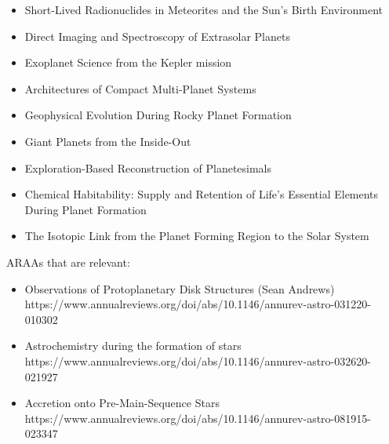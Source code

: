 \documentclass[11pt]{article}
\begin{document}
\begin{itemize}
 \item Short-Lived Radionuclides in Meteorites and the Sun’s Birth Environment
 \item Direct Imaging and Spectroscopy of Extrasolar Planets
 \item Exoplanet Science from the Kepler mission
 \item Architectures of Compact Multi-Planet Systems
 \item Geophysical Evolution During Rocky Planet Formation
 \item Giant Planets from the Inside-Out
 \item Exploration-Based Reconstruction of Planetesimals
 \item Chemical Habitability: Supply and Retention of Life’s Essential Elements During Planet Formation
 \item The Isotopic Link from the Planet Forming Region to the Solar System
\end{itemize}


ARAAs that are relevant:
\begin{itemize}
    \item Observations of Protoplanetary Disk Structures (Sean Andrews) https://www.annualreviews.org/doi/abs/10.1146/annurev-astro-031220-010302
    \item Astrochemistry during the formation of stars https://www.annualreviews.org/doi/abs/10.1146/annurev-astro-032620-021927
    \item Accretion onto Pre-Main-Sequence Stars https://www.annualreviews.org/doi/abs/10.1146/annurev-astro-081915-023347
\end{itemize}



\end{document}
